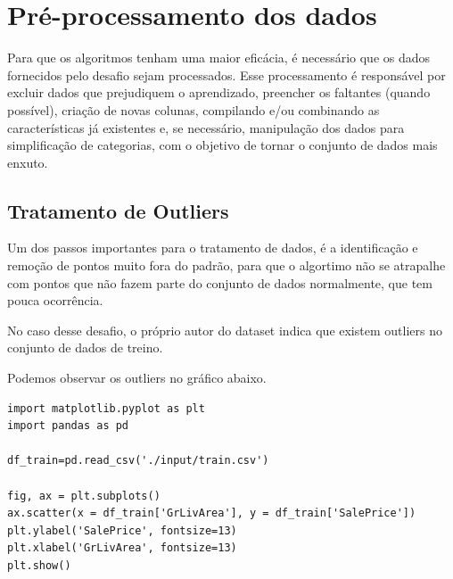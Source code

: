 \section{Pré-processamento dos dados}

Para que os algoritmos tenham uma maior eficácia, é necessário que os dados fornecidos pelo desafio sejam processados. Esse processamento é responsável por excluir dados que prejudiquem o aprendizado, preencher os faltantes (quando possível), criação de novas colunas, compilando e/ou combinando as características já existentes e, se necessário, manipulação dos dados para simplificação de categorias, com o objetivo de tornar o conjunto de dados mais enxuto.

\subsection{Tratamento de Outliers}

Um dos passos importantes para o tratamento de dados, é a identificação e remoção de pontos muito fora do padrão, para que o algortimo não se atrapalhe com pontos que não fazem parte do conjunto de dados normalmente, que tem pouca ocorrência.

No caso desse desafio, o próprio autor do dataset indica que existem outliers no conjunto de dados de treino.

Podemos observar os outliers no gráfico abaixo.

\begin{lstlisting}
import matplotlib.pyplot as plt 
import pandas as pd

df_train=pd.read_csv('./input/train.csv')

fig, ax = plt.subplots()
ax.scatter(x = df_train['GrLivArea'], y = df_train['SalePrice'])
plt.ylabel('SalePrice', fontsize=13)
plt.xlabel('GrLivArea', fontsize=13)
plt.show()

\end{lstlisting}

